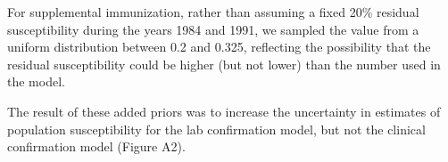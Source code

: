For supplemental immunization, rather than assuming a fixed 20\% residual susceptibility during the years 1984 and 1991, we sampled the value from a uniform distribution between 0.2 and 0.325, reflecting the possibility that the residual susceptibility could be higher (but not lower) than the number used in the model.

The result of these added priors was to increase the uncertainty in estimates of population susceptibility for the lab confirmation model, but not the clinical confirmation model (Figure A2).